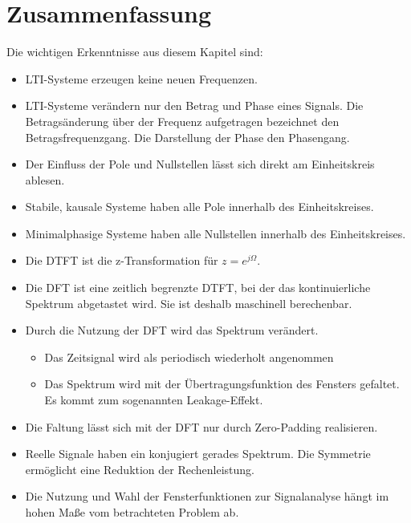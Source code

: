 {
\section{Zusammenfassung}
Die wichtigen Erkenntnisse aus diesem Kapitel sind:
\begin{itemize}
    \item LTI-Systeme erzeugen keine neuen Frequenzen.
    \item LTI-Systeme verändern nur den Betrag und Phase eines Signals. Die Betragsänderung
    über der Frequenz aufgetragen bezeichnet den Betragsfrequenzgang. Die Darstellung der Phase
    den Phasengang.
    \item Der Einfluss der Pole und Nullstellen lässt sich direkt am Einheitskreis ablesen.
    \item Stabile, kausale Systeme haben alle Pole innerhalb des Einheitskreises.
    \item Minimalphasige Systeme haben alle Nullstellen innerhalb des Einheitskreises.
    \item Die DTFT ist die z-Transformation für $z= e^{j\Omega}$.
    \item Die DFT ist eine zeitlich begrenzte DTFT, bei der das kontinuierliche Spektrum abgetastet wird.
    Sie ist deshalb maschinell berechenbar.
    \item Durch die Nutzung der DFT wird das Spektrum verändert.
    \begin{itemize}
        \item Das Zeitsignal wird als periodisch wiederholt angenommen
        \item Das Spektrum wird mit der Übertragungsfunktion des Fensters gefaltet. Es kommt zum
        sogenannten Leakage-Effekt.
    \end{itemize}
    \item Die Faltung lässt sich mit der DFT nur durch Zero-Padding realisieren.
    \item Reelle Signale haben ein konjugiert gerades Spektrum. Die Symmetrie ermöglicht eine
    Reduktion der Rechenleistung.
    \item Die Nutzung und Wahl der Fensterfunktionen zur Signalanalyse hängt im hohen Maße
    vom betrachteten Problem ab.
\end{itemize}
} 